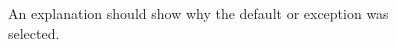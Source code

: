 \begin{figure}[H]
\centering
{}
\caption{An explanation should show why the default or exception was selected.}\label{fig:teach-P-01a-language-lesson-02}
\end{figure}
